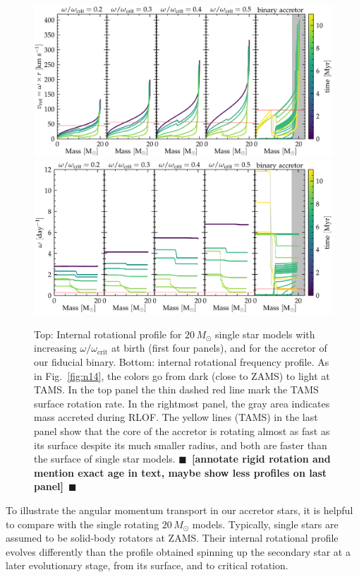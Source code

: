 \documentclass[twocolumn,twocolappendix,trackchanges]{aastex63}
\DeclareRobustCommand{\Figref}[1]{Fig.~\ref{#1}}
\newcommand{\todo}[1]{{\large $\blacksquare$~\textbf{\color{red}[#1]}}~$\blacksquare$}
\begin{document}
\begin{figure}[tbp]
  \centering
  \includegraphics[width=\textwidth]{zeta_Rotational_struct}
  \includegraphics[width=\textwidth]{omega_struct}
  \caption{Top: Internal rotational profile for $20\,M_\odot$ single
    star models with increasing $\omega/\omega_\mathrm{crit}$ at birth
    (first four panels), and for the accretor of our fiducial
    binary. Bottom: internal rotational frequency profile. As in
    \Figref{fig:n14}, the colors go from dark (close to ZAMS) to light
    at TAMS. In the top panel the thin dashed red line mark the TAMS
    surface rotation rate. In the rightmost panel, the gray area
    indicates mass accreted during RLOF. The yellow lines (TAMS) in
    the last panel show that the core of the accretor is rotating
    almost as fast as its surface despite its much smaller radius, and
    both are faster than the surface of single star
    models. \todo{annotate rigid rotation and mention exact age in
      text, maybe show less profiles on last panel}}
  \label{fig:struct_rot}
\end{figure}

To illustrate the angular momentum transport in our accretor stars, it
is helpful to compare with the single rotating $20\,M_\odot$
models. Typically, single stars are assumed to be solid-body rotators at
ZAMS. Their internal rotational profile evolves differently than the profile
obtained spinning up the secondary star at a later evolutionary stage,
from its surface, and to critical rotation.
\end{document}
